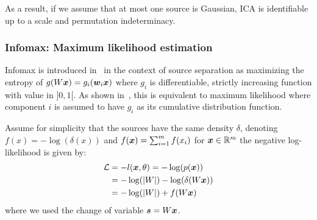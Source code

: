 As a result, if we assume that at most one source is Gaussian, ICA is identifiable up to a scale and permutation indeterminacy.

\subsubsection{Infomax: Maximum likelihood estimation}
Infomax is introduced in~\cite{bell1995information} in the context of source
separation as maximizing the entropy of $g(W \boldsymbol{x}) = g_i(\boldsymbol{w}_i \boldsymbol{x})$ where  $g_i$
is differentiable, strictly increasing function with value in $]0, 1[$. As shown
in~\cite{cois1997infomax}, this is equivalent to
maximum likelihood where component $i$ is assumed to have $g_i$ as its
cumulative distribution function.

Assume for simplicity that the sources have the same density $\delta$, denoting $f(x) =
-\log(\delta(x))$ and $f(\boldsymbol{x}) = \sum_{i=1}^m f(x_i)$ for $\boldsymbol{x} \in
\mathbb{R}^m$ the negative log-likelihood is given by:
\begin{align}
  \mathcal{L} &= -l(\boldsymbol{x}, \theta) = - \log(p(\boldsymbol{x})) \\
        &= -\log(|W|) - \log(\delta(W \boldsymbol{x})) \\
  &= -\log(|W|) + f(W \boldsymbol{x})
\end{align}
where we used the change of variable $\boldsymbol{s} = W \boldsymbol{x}$.

